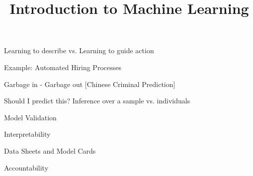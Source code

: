 


\newcommand{\learninggoals}{
\item XXXX
}


\title{Introduction to Machine Learning}
\date{}



\begin{vbframe}{Learning to describe vs. Learning to guide action}


\end{vbframe}

\begin{vbframe}{Example: Automated Hiring Processes}


\end{vbframe}
\begin{vbframe}{Garbage in - Garbage out}
[Chinese Criminal Prediction]

\end{vbframe}
\begin{vbframe}{ Should I predict this? Inference over a sample vs. individuals}


\end{vbframe}
\begin{vbframe}{Model Validation}


\end{vbframe}
\begin{vbframe}{Interpretability}


\end{vbframe}
\begin{vbframe}{Data Sheets and Model Cards}


\end{vbframe}
\begin{vbframe}{Accountability}


\end{vbframe}

\endlecture

